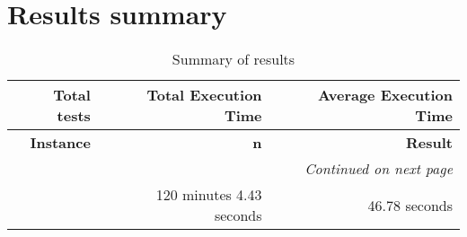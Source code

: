 \section{Results summary}
\begin{longtable}{rrr} \caption{Summary of results}\label{table:results_summary} \toprule \textbf{Total tests}& \textbf{Total Execution Time}& \textbf{Average Execution Time}\\
\midrule
\endfirsthead
\toprule
\textbf{Instance} & \textbf{n} & \textbf{Result} \\
\midrule
\endhead
\midrule
\multicolumn{3}{r}{\textit{Continued on next page}} \\
\midrule
\endfoot
\bottomrule
\endlastfoot
154 & 120 minutes 4.43 seconds & 46.78 seconds \\
\end{longtable}

